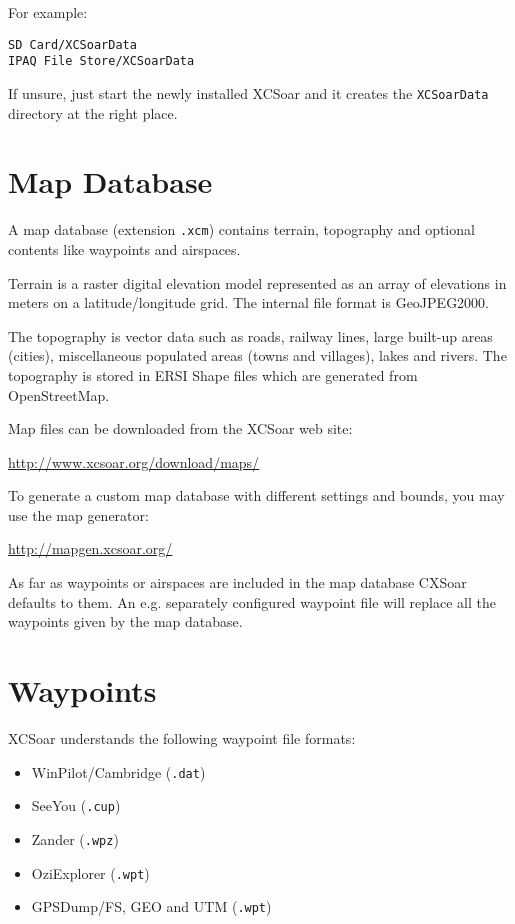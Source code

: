 For example:
\begin{verbatim}
SD Card/XCSoarData
IPAQ File Store/XCSoarData
\end{verbatim}

If unsure, just start the newly installed XCSoar and it creates the \verb|XCSoarData|
directory at the right place.

\section{Map Database}\label{sec:map}

A map database (extension \verb|.xcm|) contains terrain,
topography and optional contents like waypoints and airspaces.

Terrain is a raster digital elevation model represented as an array of
elevations in meters on a latitude/longitude grid.  The internal file
format is GeoJPEG2000.

The topography is vector data such as roads, railway lines, large
built-up areas (cities), miscellaneous populated areas (towns and
villages), lakes and rivers.  The topography is stored in ERSI Shape
files which are generated from OpenStreetMap.

Map files can be downloaded from the XCSoar web site:

\url{http://www.xcsoar.org/download/maps/}

To generate a custom map database with different settings and bounds, you
may use the map generator:

\url{http://mapgen.xcsoar.org/}

As far as waypoints or airspaces are included in the map database CXSoar 
defaults to them. An e.g. separately configured waypoint file will replace all the 
waypoints given by the map database.

\section{Waypoints}

XCSoar understands the following waypoint file formats:

\begin{itemize}
\item WinPilot/Cambridge (\verb|.dat|)
\item SeeYou (\verb|.cup|)
\item Zander (\verb|.wpz|)
\item OziExplorer (\verb|.wpt|)
\item GPSDump/FS, GEO and UTM (\verb|.wpt|)
\end{itemize}

